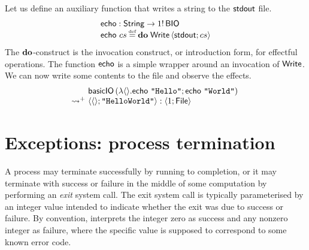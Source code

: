 \documentclass[12pt,phd,lfcs,twoside,openright,logo,leftchapter,normalheadings]{infthesis}
\theoremstyle{plain}
\theoremstyle{definition}
\begin{document}
Let us define an auxiliary function that writes a string to the
$\mathsf{stdout}$ file.
%
\[
  \bl
    \echo : \String \to \UnitType \eff\, \BIO\\%
    \echo~cs \defas \Do\;\Write\,\Record{\stdout;cs}
  \el
\]
%
The $\mathbf{do}$-construct is the invocation construct, or introduction form,
for effectful operations. The function $\mathsf{echo}$ is a simple wrapper
around an invocation of $\mathsf{Write}$.
%
We can now write some contents to the file and observe the effects.
%
\[
  \ba{@{~}l@{~}l}
                &\basicIO\,(\lambda\Unit. \echo~\strlit{Hello}; \echo~\strlit{World})\\
    \reducesto^+& \Record{\Unit;\strlit{HelloWorld}} : \Record{\UnitType;\UFile}
  \ea
\]

\section{Exceptions: process termination}
\label{sec:tiny-unix-exit}

A process may terminate successfully by running to completion, or it
may terminate with success or failure in the middle of some
computation by performing an \emph{exit} system call. The exit system
call is typically parameterised by an integer value intended to
indicate whether the exit was due to success or failure. By
convention, \UNIX{} interprets the integer zero as success and any
nonzero integer as failure, where the specific value is supposed to
correspond to some known error code.
%
\end{document}
